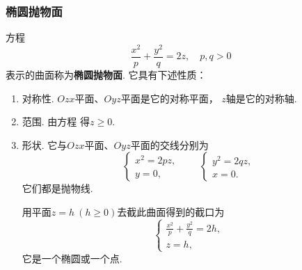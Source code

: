 \subsubsection{椭圆抛物面}
方程\begin{equation}\label{equation:解析几何.椭圆抛物面的一般方程}
	\frac{x^2}{p}+\frac{y^2}{q}=2z,
	\quad p,q>0
\end{equation}
表示的曲面称为\textbf{椭圆抛物面}.
它具有下述性质：
\begin{enumerate}
	\item 对称性.
	\(Ozx\)平面、\(Oyz\)平面是它的对称平面，
	\(z\)轴是它的对称轴.

	\item 范围.
	由方程  得\(z \geqslant 0\).

	\item 形状.
	它与\(Ozx\)平面、\(Oyz\)平面的交线分别为\[
		\left\{ \begin{array}{l}
			x^2 = 2pz, \\
			y = 0,
		\end{array} \right.
		\qquad
		\left\{ \begin{array}{l}
			y^2 = 2qz, \\
			x = 0.
		\end{array} \right.
	\]
	它们都是抛物线.

	用平面\(z = h\ (h\geqslant0)\)去截此曲面得到的截口为\[
		\left\{ \begin{array}{l}
			\frac{x^2}{p} + \frac{y^2}{q} = 2h, \\
			z = h,
		\end{array} \right.
	\]
	它是一个椭圆或一个点.
\end{enumerate}

